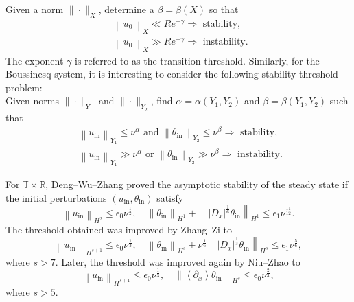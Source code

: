 \documentclass[reqno, 12pt]{amsart} %
\theoremstyle{plain} %
\theoremstyle{definition}
\theoremstyle{remark}
\numberwithin{equation}{section} %
\begin{document}
	Given a norm $\|\cdot\|_X$, determine a $\beta=\beta(X)$ so that
	$$
	\begin{aligned}
		& \left\|u_0\right\|_X \ll R e^{-\gamma} \Rightarrow \text { stability, } \\
		& \left\|u_0\right\|_X \gg R e^{-\gamma} \Rightarrow \text { instability. }
	\end{aligned}
	$$
	The exponent $\gamma$ is referred to as the transition threshold.
    Similarly, for the Boussinesq system, it is interesting to consider the following stability threshold problem:\\
	Given norms $\|\cdot\|_{Y_1}$ and $\|\cdot\|_{Y_2}$, find $\alpha=\alpha\left(Y_1, Y_2\right)$ and $\beta=\beta\left(Y_1, Y_2\right)$ such that
	$$
	\begin{aligned}
		& \left\|u_{\mathrm{in}}\right\|_{Y_1} \leq \nu^\alpha \text { and }\left\|\theta_{\mathrm{in}}\right\|_{Y_2} \leq \nu^\beta \Rightarrow \text { stability, } \\
		& \left\|u_{\mathrm{in}}\right\|_{Y_1} \gg \nu^\alpha \text { or }\left\|\theta_{\mathrm{in}}\right\|_{Y_2} \gg \nu^\beta \Rightarrow \text { instability. }
	\end{aligned}
	$$ 

	
	


    
	 For $\mathbb{T} \times \mathbb{R}$, Deng--Wu--Zhang \cite{DWZ2021} proved the asymptotic stability of the steady state if the initial perturbations $(u_{\mathrm{in}}, \theta_{\mathrm{in}})$ satisfy
    \begin{equation} \label{eq:temp0.0}
        \left\|u_{\mathrm{in}}\right\|_{H^2} \leq \epsilon_0 \nu^{\frac{1}{2}}, \quad \left\|\theta_{\mathrm{in}}\right\|_{H^1}+\left\|\left|D_x\right|^{\frac{1}{6}} \theta_{\mathrm{in}}\right\|_{H^1} \leq \epsilon_1 \nu^{\frac{11}{12}}.
    \end{equation}
	The threshold obtained was improved by Zhang--Zi \cite{ZZ2023} to
	$$
	\left\|u_{\text {in}}\right\|_{H^{s+1}} \leq \epsilon_0 \nu^{\frac{1}{3}},\quad \left\|\theta_{\text {in}}\right\|_{H^s}+\nu^{\frac{1}{6}}\left\|\left|D_x\right|^{\frac{1}{3}} \theta_{\text {in}}\right\|_{H^s} \leq \epsilon_1 \nu^{\frac{5}{6}},
	$$
	where $s>7$. Later, the threshold  was improved again by Niu--Zhao \cite{NZ2024} to
	$$
	\left\|u_{\mathrm{in}}\right\|_{H^{s+1}} \leq \epsilon_0 \nu^{\frac{1}{3}}, \quad \left\|\left\langle\partial_x\right\rangle \theta_{\mathrm{in}}\right\|_{H^s} \leq \epsilon_0 \nu^{\frac{2}{3}},
	$$
	where $s>5$. 
\end{document}
